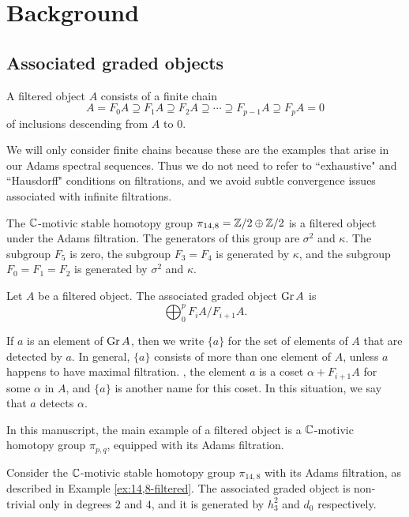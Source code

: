 \chapter{Background}
\label{ch:background}

\section{Associated graded objects}
\label{sctn:assoc-graded}

\begin{defn}
A filtered object $A$ consists of a finite chain
\[
A = F_0 A \supseteq F_1 A \supseteq F_2 A \supseteq \cdots
\supseteq F_{p-1} A \supseteq F_p A = 0
\]
of inclusions descending from $A$ to $0$.
\end{defn}

We will only consider finite chains because these are the examples
that arise in our Adams spectral sequences.  Thus we do not need
to refer to ``exhaustive" and ``Hausdorff" conditions on filtrations,
and we avoid subtle convergence issues associated with infinite filtrations.

\begin{ex}
\label{ex:14,8-filtered}
The $\mathbb{C}$-motivic stable homotopy group $\pi_{14,8} = \mathbb{Z}/2 \oplus \mathbb{Z}/2$
is a filtered object under the Adams filtration.  
The generators of this group are $\sigma^2$ and $\kappa$.
The subgroup $F_5$ is zero, the subgroup $F_3 = F_4$ is generated
by $\kappa$, and the subgroup $F_0 = F_1 = F_2$ is generated by
$\sigma^2$ and $\kappa$.
\end{ex}

\begin{defn}
Let $A$ be a filtered object.  The associated graded object
$\operatorname{Gr} A$ is
\[
\bigoplus_0^p F_i A / F_{i+1} A.
\]
\end{defn}

If $a$ is an element of $\operatorname{Gr} A$, then
we write $\{a\}$ for the set of elements of $A$ that are detected
by $a$.  In general, $\{a\}$ consists of more than one element of $A$,
unless $a$ happens to have maximal filtration.  
, the element $a$ is a coset $\alpha + F_{i+1} A$
for some $\alpha$ in $A$,
and $\{a\}$ is another name for this coset.
In this situation, we say that $a$ detects $\alpha$.

In this manuscript, the main example of a filtered object is
a $\mathbb{C}$-motivic homotopy group $\pi_{p,q}$, equipped with its Adams
filtration.  

\begin{ex}
\label{ex:14,8-assoc-graded}
Consider the $\mathbb{C}$-motivic stable homotopy group $\pi_{14,8}$
with its Adams filtration, as described in Example \ref{ex:14,8-filtered}.
The associated graded object is non-trivial only in degrees
$2$ and $4$, and it is generated by $h_3^2$ and $d_0$ respectively.
\end{ex}


